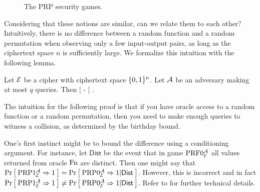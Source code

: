 \begin{figure}
	\centering
\caption{The PRP security games.}
\label{fig:prp}	
\end{figure}

Considering that these notions are similar, can we relate them to each other? Intuitively, there is no difference between a random function and a random permutation when observing only a few input-output pairs, as long as the ciphertext space $n$ is sufficiently large. We formalize this intuition with the following lemma. 

\begin{lem}
	\label{switching-lem}
	Let ${\cal E}$ be a cipher with ciphertext space $\{0,1\}^n$. 
	Let ${\mathcal A}$ be an adversary making at most $q$ queries. Then
	\bnm
	\left|  
	-  \right| \le {}  \;.
	\enm
\end{lem}

The intuition for the following proof is that if you have oracle access to a random function or a random permutation, then you need to make enough queries to witness a collision, as determined by the birthday bound. 

One's first instinct might be to bound the difference using a conditioning argument. For instance, let $\mathsf{Dist}$ be the event that in game $\textnormal{PRF}0_{{\cal E}}^{\mathcal A}$ all values returned from oracle $\textnormal{Fn}$ are distinct. Then one might say that $\Pr\left[\: \textnormal{PRP}1_{\cal E}^{\mathcal A}\Rightarrow 1 \:\right] =   \Pr\left[\: \textnormal{PRP}0_{\cal E}^{\mathcal A}\Rightarrow1 | \mathsf{Dist} \:\right]$. However, this is incorrect and in fact $\Pr\left[\: \textnormal{PRP}1_{\cal E}^{\mathcal A}\Rightarrow 1 \:\right] \neq   \Pr\left[\: \textnormal{PRP}0_{\cal E}^{\mathcal A}\Rightarrow1 | \mathsf{Dist} \:\right]$. Refer to \cite{bellare2006multi} for further technical details. 

